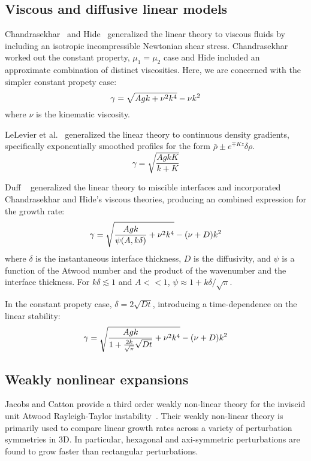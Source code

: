 \subsection{Viscous and diffusive linear models}
Chandrasekhar~\cite{Chandrasekhar1955} and Hide~\cite{Hide1955} generalized the linear theory to viscous fluids by including an isotropic incompressible Newtonian shear stress.
Chandrasekhar worked out the constant property, $\mu_1 = \mu_2$ case and Hide included an approximate combination of distinct viscosities.
Here, we are concerned with the simpler constant propety case:
\begin{equation} \elabel{visc_growth}
  \gamma = \sqrt{A g k + \nu^2 k^4} - \nu k^2
\end{equation} 
where 
$\nu$ is the kinematic viscosity.

LeLevier et al.~\cite{LeLevier1955} generalized the linear theory to continuous density gradients, specifically exponentially smoothed profiles for the form $\bar\rho \pm e^{\mp K z} \delta\rho$.
\begin{equation}
\gamma = \sqrt{\frac{A g k K}{k + K}}
\end{equation}

Duff \etal~\cite{Duff1962} generalized the linear theory to miscible interfaces and incorporated Chandrasekhar and Hide's viscous theories, producing an combined expression for the growth rate:
\begin{equation} \elabel{duff_simple}
\gamma = \sqrt{\frac{A g k}{\psi(A,k\delta)} + \nu^2 k^4} - (\nu + D) k^2
\end{equation}
where 
$\delta$ is the instantaneous interface thickness,
$D$ is the diffusivity,
and $\psi$ is a function of the Atwood number and the product of the wavenumber and the interface thickness.
For $k \delta \lesssim 1$ and $A << 1$, $\psi \approx 1 + k \delta / \sqrt{\pi}$.

In the constant propety case, $\delta = 2 \sqrt{D t}$, introducing a time-dependence on the linear stability:
\begin{equation} \elabel{duff_growth}
\gamma = \sqrt{\frac{A g k}{1 + \frac{2 k}{\sqrt{\pi}}\sqrt{D t} } + \nu^2 k^4} - (\nu + D) k^2
\end{equation}

\subsection{Weakly nonlinear expansions}
Jacobs and Catton provide a third order weakly non-linear theory for the inviscid unit Atwood Rayleigh-Taylor instability~\cite{Jacobs1988}.
Their weakly non-linear theory is primarily used to compare linear growth rates across a variety of perturbation symmetries in 3D.
In particular, hexagonal and axi-symmetric perturbations are found to grow faster than rectangular perturbations.

